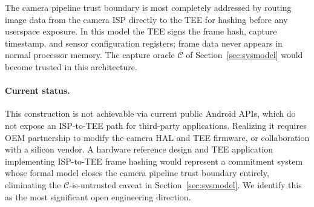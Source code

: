 \documentclass[11pt,a4paper]{article}
\newcommand{\calC}{\mathcal{C}}
\begin{document}
The camera pipeline trust boundary is most completely addressed by routing
image data from the camera ISP directly to the TEE for hashing before any
userspace exposure.  In this model the TEE signs the frame hash, capture
timestamp, and sensor configuration registers; frame data never appears in
normal processor memory.  The capture oracle $\calC$ of
Section~\ref{sec:sysmodel} would become trusted in this architecture.

\paragraph{Current status.} This construction is not achievable via current
public Android APIs, which do not expose an ISP-to-TEE path for third-party
applications.  Realizing it requires OEM partnership to modify the camera HAL
and TEE firmware, or collaboration with a silicon vendor.  A hardware reference
design and TEE application implementing ISP-to-TEE frame hashing would represent
a commitment system whose formal model closes the camera pipeline trust boundary
entirely, eliminating the $\calC$-is-untrusted caveat in
Section~\ref{sec:sysmodel}.  We identify this as the most significant open
engineering direction.
\end{document}
